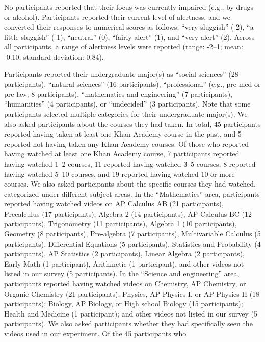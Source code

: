 \documentclass[10pt]{article}
\begin{document}
No participants reported that their focus was currently impaired (e.g., by
drugs or alcohol). Participants reported their current level of alertness, and
we converted their responses to numerical scores as follows: ``very sluggish''
(-2), ``a little sluggish'' (-1), ``neutral'' (0), ``fairly alert'' (1), and
``very alert'' (2). Across all participants, a range of alertness levels were
reported (range: -2--1; mean: -0.10; standard deviation: 0.84).

Participants reported their undergraduate major(s) as ``social sciences'' (28
participants), ``natural sciences'' (16 participants), ``professional'' (e.g.,
pre-med or pre-law; 8 participants), ``mathematics and engineering'' (7
participants), ``humanities'' (4 participants), or ``undecided'' (3
participants). Note that some participants selected multiple categories for
their undergraduate major(s). We also asked participants about the courses they
had taken. In total, 45 participants reported having taken at least one Khan
Academy course in the past, and 5 reported not having taken any Khan Academy
courses. Of those who reported having watched at least one Khan Academy course,
7 participants reported having watched 1--2 courses, 11 reported having watched
3--5 courses, 8 reported having watched 5--10 courses, and 19 reported having
watched 10 or more courses. We also asked participants about the specific
courses they had watched, categorized under different subject areas. In the
``Mathematics'' area, participants reported having watched videos on AP
Calculus AB (21 participants), Precalculus (17 participants), Algebra 2 (14
participants), AP Calculus BC (12 participants), Trigonometry (11
participants), Algebra 1 (10 participants), Geometry (8 participants),
Pre-algebra (7 participants), Multivariable Calculus (5 participants),
Differential Equations (5 participants), Statistics and Probability (4
participants), AP Statistics (2 participants), Linear Algebra (2 participants),
Early Math (1 participant), Arithmetic (1 participant), and other videos not
listed in our survey (5 participants). In the ``Science and engineering'' area,
participants reported having watched videos on Chemistry, AP Chemistry, or
Organic Chemistry (21 participants); Physics, AP Physics I, or AP Physics II
(18 participants); Biology, AP Biology, or High school Biology (15
participants); Health and Medicine (1 participant); and other videos not listed
in our survey (5 participants). We also asked participants whether they had
specifically seen the videos used in our experiment. Of the 45 participants who
\end{document}
